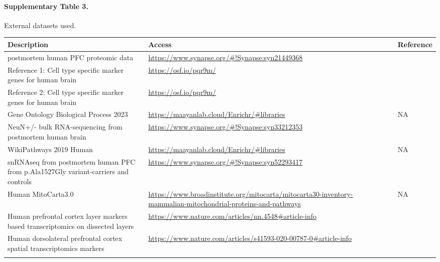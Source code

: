 \paragraph*{Supplementary Table 3.} External datasets used. 
{}
\begin{longtable}{p{7cm} p{7cm} p{3cm}}
    \hline
    \textbf{Description} & \textbf{Access} & \textbf{Reference} \\ 
    \hline
    \hline
    postmortem human PFC proteomic data & \url{https://www.synapse.org/\#!Synapse:syn21449368} & \supercite{Johnson2020-ib} \\
    \hline
    Reference 1: Cell type specific marker genes for human brain & \url{https://osf.io/pqr9m/} & \supercite{Wang2018-im} \\
    \hline
    Reference 2: Cell type specific marker genes for human brain & \url{https://osf.io/pqr9m/} & \supercite{Franzen2019-hh} \\
    \hline
    Gene Ontology Biological Process 2023 & \url{https://maayanlab.cloud/Enrichr/\#libraries} & NA \\
    \hline
    NeuN+/- bulk RNA-sequencing from postmortem human brain & \url{https://www.synapse.org/\#!Synapse:syn33212353} & \supercite{Welch2022-ef} \\
    \hline
    WikiPathways 2019 Human & \url{https://maayanlab.cloud/Enrichr/\#libraries} & NA \\
    \hline
    snRNAseq from postmortem human PFC from p.Ala1527Gly variant-carriers and controls & \url{https://www.synapse.org/\#!Synapse:syn52293417} & \supercite{Mathys2023-rs} \\ 
    \hline
    Human MitoCarta3.0 & \url{https://www.broadinstitute.org/mitocarta/mitocarta30-inventory-mammalian-mitochondrial-proteins-and-pathways} & NA \\
    \hline
    Human prefrontal cortex layer markers based transcriptomics on dissected layers & \url{https://www.nature.com/articles/nn.4548#article-info} & \supercite{He2017-dq} \\
    \hline
    Human dorsolateral prefrontal cortex spatial transcriptomics markers & \url{https://www.nature.com/articles/s41593-020-00787-0#article-info} & \supercite{Maynard2021-mz} \\
    \hline
    \label{tab:external_datasets}
\end{longtable}

